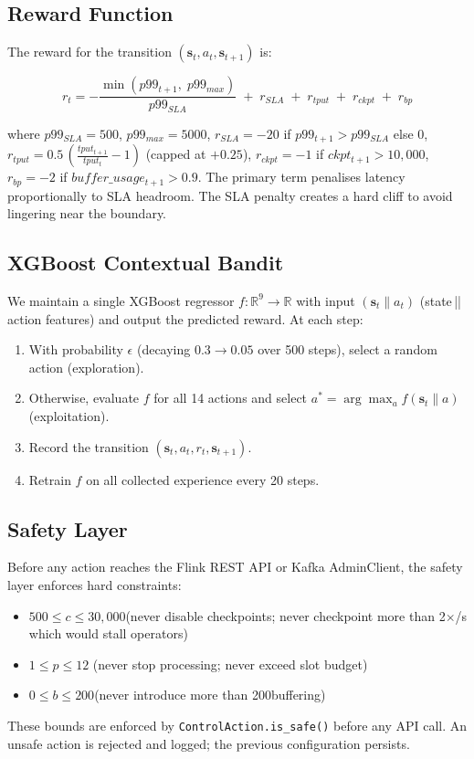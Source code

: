 \subsection{Reward Function}
The reward for the transition $(\mathbf{s}_t, a_t, \mathbf{s}_{t+1})$ is:

\begin{equation}
r_t = -\frac{\min(p99_{t+1},\; p99_{max})}{p99_{SLA}}
      \;+\; r_{SLA}
      \;+\; r_{tput}
      \;+\; r_{ckpt}
      \;+\; r_{bp}
\end{equation}

where $p99_{SLA}=500$\ms, $p99_{max}=5000$\ms,
$r_{SLA}=-20$ if $p99_{t+1}>p99_{SLA}$ else $0$,
$r_{tput}=0.5\,(\frac{tput_{t+1}}{tput_t}-1)$ (capped at $+0.25$),
$r_{ckpt}=-1$ if $ckpt_{t+1}>10{,}000$\ms,
$r_{bp}=-2$ if $buffer\_usage_{t+1}>0.9$.
The primary term penalises latency proportionally to SLA headroom.
The SLA penalty creates a hard cliff to avoid lingering near the boundary.

\subsection{XGBoost Contextual Bandit}
We maintain a single XGBoost regressor $f: \mathbb{R}^{9} \to \mathbb{R}$
with input $(\mathbf{s}_t \| a_t)$ (state\,||\,action features) and
output the predicted reward.
At each step:
\begin{enumerate}
  \item With probability $\epsilon$ (decaying $0.3\to0.05$ over 500 steps),
    select a random action (exploration).
  \item Otherwise, evaluate $f$ for all 14 actions and select
    $a^* = \arg\max_a f(\mathbf{s}_t \| a)$ (exploitation).
  \item Record the transition $(\mathbf{s}_t, a_t, r_t, \mathbf{s}_{t+1})$.
  \item Retrain $f$ on all collected experience every 20 steps.
\end{enumerate}

\subsection{Safety Layer}
Before any action reaches the Flink REST API or Kafka AdminClient,
the safety layer enforces hard constraints:
\begin{itemize}
  \item $500 \leq c \leq 30{,}000$\ms (never disable checkpoints;
    never checkpoint more than 2$\times$/s which would stall operators)
  \item $1 \leq p \leq 12$ (never stop processing; never exceed slot budget)
  \item $0 \leq b \leq 200$\ms (never introduce more than 200\ms buffering)
\end{itemize}
These bounds are enforced by \texttt{ControlAction.is\_safe()} before any
API call. An unsafe action is rejected and logged; the previous
configuration persists.

